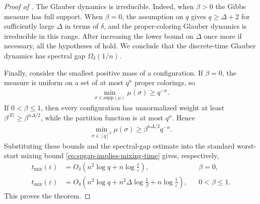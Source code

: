\documentclass[a4paper,12pt]{article}
\theoremstyle{plain}
\theoremstyle{definition}
\def\-#1{\mathrm{#1}} %
\def\-#1{\mathrm{#1}} %
\newcommand{\tuple}[1]{\left(#1\right)}
\newcommand{\tp}{\tuple}
\newcommand{\abs}[1]{\left\vert#1\right\vert}
\begin{document}
\begin{proof}[Proof of ]
The Glauber dynamics is irreducible.  Indeed, when $\beta>0$ the Gibbs
measure has full support.  When $\beta=0$, the assumption on $q$ gives
$q\geq\Delta+2$ for sufficiently large $\Delta$ in terms of $\delta$,
and the proper-coloring Glauber dynamics is irreducible in this range.
After increasing the lower bound on $\Delta$ once more if necessary,
all the hypotheses of  hold.  We conclude that the
discrete-time Glauber dynamics has spectral gap
$\Omega_\delta(1/n)$.

Finally, consider the smallest positive mass of a configuration.  If
$\beta=0$, the measure is uniform on a set of at most $q^n$ proper
colorings, so
\begin{align*}
  \min_{\sigma\in\-{supp}(\mu)}\mu(\sigma)\geq q^{-n}.
\end{align*}
If $0<\beta\leq1$, then every configuration has unnormalized weight at
least $\beta^{\abs{E}}\geq\beta^{n\Delta/2}$, while the partition
function is at most $q^n$.  Hence
\begin{align*}
  \min_{\sigma\in[q]^V}\mu(\sigma)
  \geq
  \beta^{n\Delta/2}q^{-n}.
\end{align*}
Substituting these bounds and the spectral-gap estimate into the
standard worst-start mixing bound
\eqref{eq:spgap-implies-mixing-time} gives, respectively,
\begin{align*}
  t_{\mathrm{mix}}(\varepsilon)
  &=
  O_\delta\tp{
    n^2\log q+n\log\frac1\varepsilon
  },
  &&\beta=0,
  \\
  t_{\mathrm{mix}}(\varepsilon)
  &=
  O_\delta\tp{
    n^2\log q+n^2\Delta\log\frac1\beta
    +n\log\frac1\varepsilon
  },
  &&0<\beta\leq1.
\end{align*}
This proves the theorem.
\end{proof}


\begingroup
\footnotesize
\raggedright

\endgroup
\end{document}
